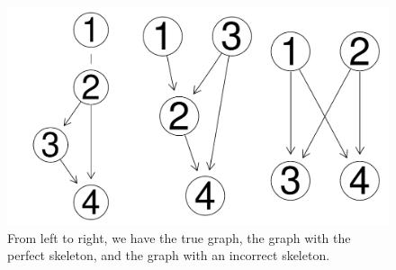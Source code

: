 \documentclass[12pt]{article}\usepackage[]{graphicx}\usepackage[]{xcolor}
\makeatletter
\def\maxwidth{ %
  \ifdim\Gin@nat@width>\linewidth
    \linewidth
  \else
    \Gin@nat@width
  \fi
}
\newenvironment{knitrout}{}{} %
\makeatother
\begin{document}
\begin{knitrout}
\color{fgcolor}\begin{figure}
\includegraphics[width=\maxwidth]{figure/unnamed-chunk-3-1} \caption[From left to right, we have the true graph, the graph with the perfect skeleton, and the graph with an incorrect skeleton]{From left to right, we have the true graph, the graph with the perfect skeleton, and the graph with an incorrect skeleton.}\label{fig:unnamed-chunk-3}
\end{figure}

\end{knitrout}
\end{document}
